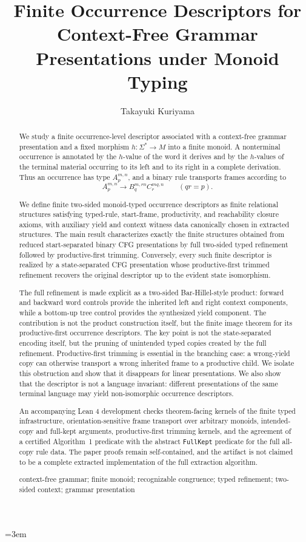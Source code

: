 \documentclass[sub]{jalc}
\title{Finite Occurrence Descriptors for Context-Free Grammar Presentations under Monoid Typing}
\author{Takayuki Kuriyama}
\begin{document}
\emergencystretch=3em
\maketitle


\begin{abstract}
We study a finite occurrence-level descriptor associated with a context-free
grammar presentation and a fixed morphism
\(h:\Sigma^*\to M\) into a finite monoid.  A nonterminal occurrence is
annotated by the \(h\)-value of the word it derives and by the \(h\)-values of
the terminal material occurring to its left and to its right in a complete
derivation.  Thus an occurrence has type \(A_p^{m,n}\), and a binary rule
transports frames according to
\[
  A_p^{m,n}\to B_q^{m,rn}C_r^{mq,n}\qquad(qr=p).
\]

We define finite two-sided monoid-typed occurrence descriptors as finite
relational structures satisfying typed-rule, start-frame, productivity, and
reachability closure axioms, with auxiliary yield and context witness data
canonically chosen in extracted structures.  The main result characterizes
exactly the finite structures obtained from reduced start-separated binary CFG
presentations by full two-sided typed refinement followed by productive-first
trimming.  Conversely, every such finite descriptor is realized by a
state-separated CFG presentation whose productive-first trimmed refinement
recovers the original descriptor up to the evident state isomorphism.

The full refinement is made explicit as a two-sided Bar-Hillel-style product:
forward and backward word controls provide the inherited left and right context
components, while a bottom-up tree control provides the synthesized yield
component.  The contribution is not the product construction itself, but the
finite image theorem for its productive-first occurrence descriptors.  The key
point is not the state-separated encoding itself, but the pruning of unintended
typed copies created by the full refinement.  Productive-first trimming is
essential in the branching case: a wrong-yield copy can otherwise transport a
wrong inherited frame to a productive child.  We isolate this obstruction and
show that it disappears for linear presentations.  We also show that the
descriptor is not a language invariant: different presentations of the same
terminal language may yield non-isomorphic occurrence descriptors.

An accompanying Lean 4 development checks theorem-facing kernels of the finite
typed infrastructure, orientation-sensitive frame transport over arbitrary
monoids, intended-copy and full-kept arguments, productive-first trimming
kernels, and the agreement of a certified Algorithm~1 predicate with the
abstract \texttt{FullKept} predicate for the full all-copy rule data.  The paper
proofs remain self-contained, and the artifact is not claimed to be a complete
extracted implementation of the full extraction algorithm.

\keywords context-free grammar; finite monoid; recognizable congruence; typed refinement; two-sided context; grammar presentation
\end{abstract}
\end{document}
